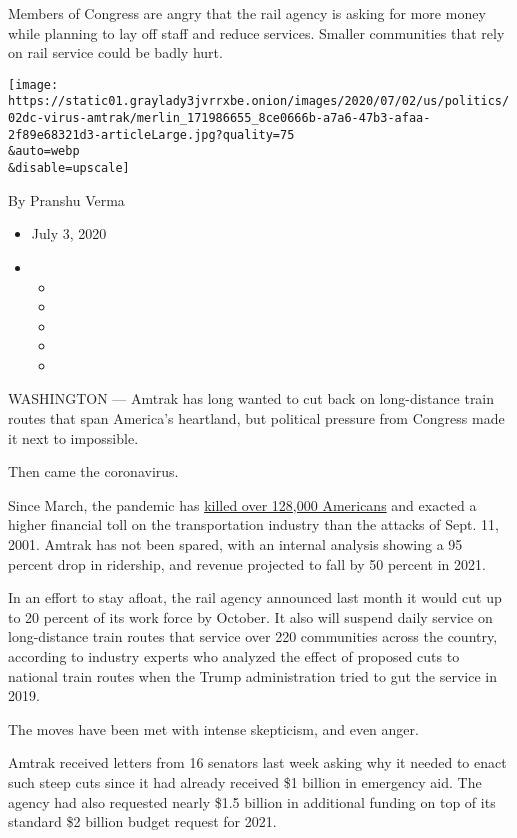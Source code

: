 Members of Congress are angry that the rail agency is asking for more
money while planning to lay off staff and reduce services. Smaller
communities that rely on rail service could be badly hurt.

\texttt{[image: https://static01.graylady3jvrrxbe.onion/images/2020/07/02/us/politics/02dc-virus-amtrak/merlin\_171986655\_8ce0666b-a7a6-47b3-afaa-2f89e68321d3-articleLarge.jpg?quality=75\\\&auto=webp\\\&disable=upscale]}

By Pranshu Verma

\begin{itemize}
\item
  July 3, 2020
\item
  \begin{itemize}
  \item
  \item
  \item
  \item
  \item
  \end{itemize}
\end{itemize}

WASHINGTON --- Amtrak has long wanted to cut back on long-distance train
routes that span America's heartland, but political pressure from
Congress made it next to impossible.

Then came the coronavirus.

Since March, the pandemic has
\href{https://www.nytimes3xbfgragh.onion/interactive/2020/us/coronavirus-us-cases.html}{killed
over 128,000 Americans} and exacted a higher financial toll on the
transportation industry than the attacks of Sept. 11, 2001. Amtrak has
not been spared, with an internal analysis showing a 95 percent drop in
ridership, and revenue projected to fall by 50 percent in 2021.

In an effort to stay afloat, the rail agency announced last month it
would cut up to 20 percent of its work force by October. It also will
suspend daily service on long-distance train routes that service over
220 communities across the country, according to industry experts who
analyzed the effect of proposed cuts to national train routes when the
Trump administration tried to gut the service in 2019.

The moves have been met with intense skepticism, and even anger.

Amtrak received letters from 16 senators last week asking why it needed
to enact such steep cuts since it had already received \$1 billion in
emergency aid. The agency had also requested nearly \$1.5 billion in
additional funding on top of its standard \$2 billion budget request for
2021.

